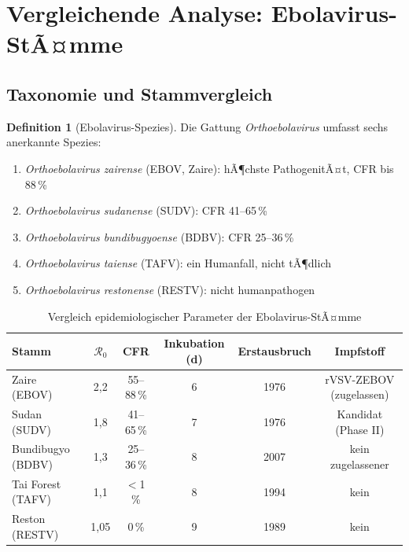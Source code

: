 ﻿\documentclass[12pt,a4paper]{article}
\theoremstyle{definition}
\newtheorem{definition}{Definition}[section]
\theoremstyle{plain}
\theoremstyle{remark}
\begin{document}
\section{Vergleichende Analyse: Ebolavirus-StÃ¤mme}

\subsection{Taxonomie und Stammvergleich}

\begin{definition}[Ebolavirus-Spezies]
Die Gattung \textit{Orthoebolavirus} umfasst sechs anerkannte Spezies:
\begin{enumerate}
  \item \textit{Orthoebolavirus zairense} (EBOV, Zaire): hÃ¶chste PathogenitÃ¤t, CFR bis 88\,\%
  \item \textit{Orthoebolavirus sudanense} (SUDV): CFR 41--65\,\%
  \item \textit{Orthoebolavirus bundibugyoense} (BDBV): CFR 25--36\,\%
  \item \textit{Orthoebolavirus taiense} (TAFV): ein Humanfall, nicht tÃ¶dlich
  \item \textit{Orthoebolavirus restonense} (RESTV): nicht humanpathogen
\end{enumerate}
\end{definition}

\begin{table}[H]
\centering
\caption{Vergleich epidemiologischer Parameter der Ebolavirus-StÃ¤mme}
\label{tab:strains}
\begin{tabular}{lccccc}
\toprule
Stamm & $\mathcal{R}_0$ & CFR & Inkubation (d) & Erstausbruch & Impfstoff \\
\midrule
Zaire (EBOV)      & 2,2  & 55--88\,\% & 6 & 1976 & rVSV-ZEBOV (zugelassen) \\
Sudan (SUDV)      & 1,8  & 41--65\,\% & 7 & 1976 & Kandidat (Phase II)     \\
Bundibugyo (BDBV) & 1,3  & 25--36\,\% & 8 & 2007 & kein zugelassener       \\
Tai Forest (TAFV) & 1,1  & $<$1\,\%   & 8 & 1994 & kein                    \\
Reston (RESTV)    & 1,05 & 0\,\%      & 9 & 1989 & kein                    \\
\bottomrule
\end{tabular}
\end{table}
\end{document}
